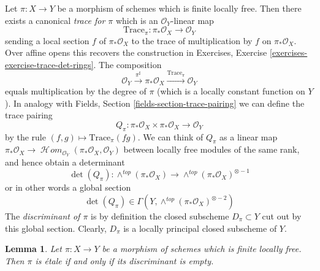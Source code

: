 \documentclass{stacks-project}
\theoremstyle{plain}
\newtheorem{lemma}[subsection]{Lemma}
\theoremstyle{definition}
\theoremstyle{remark}
\numberwithin{equation}{subsection}
\def\SheafHom{\mathop{\mathcal{H}\!\mathit{om}}\nolimits}
\begin{document}
\medskip\noindent
Let $\pi : X \to Y$ be a morphism of schemes which is finite locally
free. Then there exists a canonical {\it trace for $\pi$}
which is an $\mathcal{O}_Y$-linear map
$$
\text{Trace}_\pi : \pi_*\mathcal{O}_X \longrightarrow \mathcal{O}_Y
$$
sending a local section $f$ of $\pi_*\mathcal{O}_X$ to the
trace of multiplication by $f$ on $\pi_*\mathcal{O}_X$. Over
affine opens this recovers the construction in
Exercises, Exercise \ref{exercises-exercise-trace-det-rings}.
The composition
$$
\mathcal{O}_Y \xrightarrow{\pi^\sharp} \pi_*\mathcal{O}_X
\xrightarrow{\text{Trace}_\pi} \mathcal{O}_Y
$$
equals multiplication by the degree of $\pi$ (which is a locally constant
function on $Y$). In analogy with
Fields, Section \ref{fields-section-trace-pairing}
we can define the trace pairing
$$
Q_\pi :
\pi_*\mathcal{O}_X \times \pi_*\mathcal{O}_X
\longrightarrow
\mathcal{O}_Y
$$
by the rule $(f, g) \mapsto \text{Trace}_\pi(fg)$. We can think of
$Q_\pi$ as a linear map
$\pi_*\mathcal{O}_X \to
\SheafHom_{\mathcal{O}_Y}(\pi_*\mathcal{O}_X, \mathcal{O}_Y)$
between locally free modules of the same rank, and hence obtain
a determinant
$$
\det(Q_\pi) :
\wedge^{top}(\pi_*\mathcal{O}_X)
\longrightarrow
\wedge^{top}(\pi_*\mathcal{O}_X)^{\otimes -1}
$$
or in other words a global section
$$
\det(Q_\pi) \in \Gamma(Y, \wedge^{top}(\pi_*\mathcal{O}_X)^{\otimes -2})
$$
The {\it discriminant of $\pi$} is by definition the closed
subscheme $D_\pi \subset Y$ cut out by this global section.
Clearly, $D_\pi$ is a locally principal closed subscheme of $Y$.

\begin{lemma}
\label{lemma-discriminant}
Let $\pi : X \to Y$ be a morphism of schemes which is finite locally
free. Then $\pi$ is \'etale if and only if its discriminant is empty.
\end{lemma}
\end{document}
